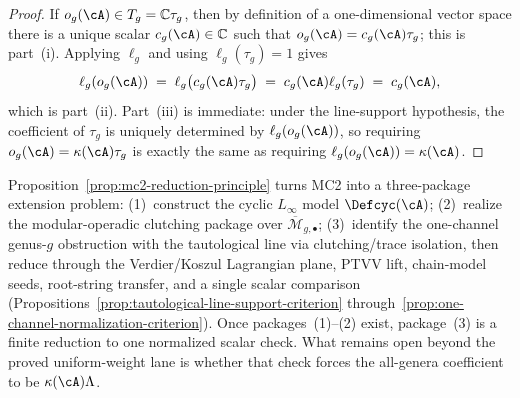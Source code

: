 \begin{proof}
If $o_g(\cA)\in T_g=\mathbb{C}\tau_g$, then by definition of a
one-dimensional vector space there is a unique scalar
$c_g(\cA)\in\mathbb{C}$ such that
$o_g(\cA)=c_g(\cA)\tau_g$; this is part~\textup{(i)}.
Applying $\ell_g$ and using $\ell_g(\tau_g)=1$ gives
\[
\ell_g(o_g(\cA))
\;=\;
\ell_g\bigl(c_g(\cA)\tau_g\bigr)
\;=\;
c_g(\cA)\ell_g(\tau_g)
\;=\;
c_g(\cA),
\]
which is part~\textup{(ii)}.
Part~\textup{(iii)} is immediate: under the line-support hypothesis,
the coefficient of $\tau_g$ is uniquely determined by
$\ell_g(o_g(\cA))$, so requiring
$o_g(\cA)=\kappa(\cA)\tau_g$ is exactly the same as requiring
$\ell_g(o_g(\cA))=\kappa(\cA)$.
\end{proof}

\begin{remark}
\label{rem:mc2-reduction-consequence}
Proposition~\ref{prop:mc2-reduction-principle} turns MC2 into a
three-package extension problem:
(1)~construct the cyclic $L_\infty$ model $\Defcyc(\cA)$;
(2)~realize the modular-operadic clutching package over
$\overline{\mathcal{M}}_{g,\bullet}$;
(3)~identify the one-channel genus-$g$ obstruction with the
tautological line via clutching/trace isolation, then reduce
through the Verdier/Koszul Lagrangian plane, PTVV lift,
chain-model seeds, root-string transfer, and a single scalar
comparison
(Propositions~\ref{prop:tautological-line-support-criterion}
through~\ref{prop:one-channel-normalization-criterion}).
Once packages~(1)--(2) exist, package~(3) is a finite
reduction to one normalized scalar check.  What remains open beyond
the proved uniform-weight lane is whether that check forces the
all-genera coefficient to be $\kappa(\cA)\Lambda$.
\end{remark}

